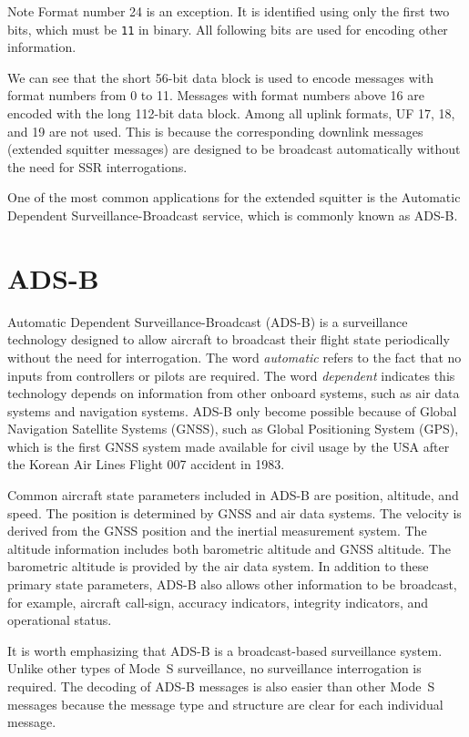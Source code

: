 \begin{notebox}{Note}
  Format number 24 is an exception. It is identified using only the first two bits, which must be \texttt{11} in binary. All following bits are used for encoding other information.
\end{notebox}


We can see that the short 56-bit data block is used to encode messages with format numbers from 0 to 11. Messages with format numbers above 16 are encoded with the long 112-bit data block. Among all uplink formats, UF 17, 18, and 19 are not used. This is because the corresponding downlink messages (extended squitter messages) are designed to be broadcast automatically without the need for SSR interrogations. 

One of the most common applications for the extended squitter is the Automatic Dependent Surveillance-Broadcast service, which is commonly known as ADS-B.


\section{ADS-B}

Automatic Dependent Surveillance-Broadcast (ADS-B) is a surveillance technology designed to allow aircraft to broadcast their flight state periodically without the need for interrogation. The word \emph{automatic} refers to the fact that no inputs from controllers or pilots are required. The word \emph{dependent} indicates this technology depends on information from other onboard systems, such as air data systems and navigation systems. ADS-B only become possible because of Global Navigation Satellite Systems (GNSS), such as Global Positioning System (GPS), which is the first GNSS system made available for civil usage by the USA after the Korean Air Lines Flight 007 accident in 1983.

Common aircraft state parameters included in ADS-B are position, altitude, and speed. The position is determined by GNSS and air data systems. The velocity is derived from the GNSS position and the inertial measurement system. The altitude information includes both barometric altitude and GNSS altitude. The barometric altitude is provided by the air data system. In addition to these primary state parameters, ADS-B also allows other information to be broadcast, for example, aircraft call-sign, accuracy indicators, integrity indicators, and operational status.

It is worth emphasizing that ADS-B is a broadcast-based surveillance system. Unlike other types of Mode~S surveillance, no surveillance interrogation is required. The decoding of ADS-B messages is also easier than other Mode~S messages because the message type and structure are clear for each individual message.

